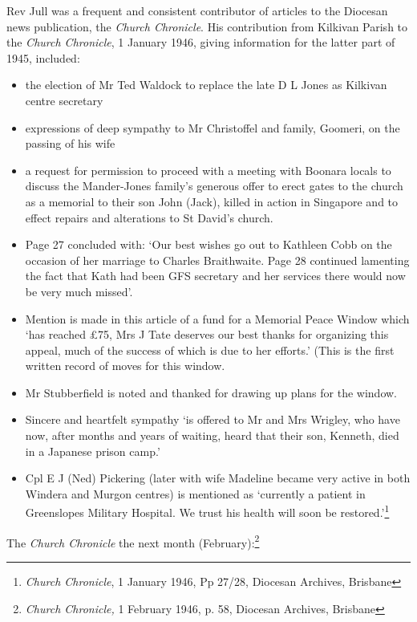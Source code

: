Rev Jull was a frequent and consistent contributor of articles to the Diocesan news publication, the \emph{Church Chronicle}. His contribution from Kilkivan Parish to the \emph{Church Chronicle}, 1 January 1946, giving information for the latter part of 1945, included:

\begin{itemize}
\item
  the election of Mr Ted Waldock to replace the late D L Jones as Kilkivan centre secretary
\item
  expressions of deep sympathy to Mr Christoffel and family, Goomeri, on the passing of his wife
\item
  a request for permission to proceed with a meeting with Boonara locals to discuss the Mander-Jones family's generous offer to erect gates to the church as a memorial to their son John (Jack), killed in action in Singapore and to effect repairs and alterations to St David's church.
\item
  Page 27 concluded with: `Our best wishes go out to Kathleen Cobb on the occasion of her marriage to Charles Braithwaite. Page 28 continued lamenting the fact that Kath had been GFS secretary and her services there would now be very much missed'.
\item
  Mention is made in this article of a fund for a Memorial Peace Window which `has reached £75, Mrs J Tate deserves our best thanks for organizing this appeal, much of the success of which is due to her efforts.' (This is the first written record of moves for this window.
\item
  Mr Stubberfield is noted and thanked for drawing up plans for the window.
\item
  Sincere and heartfelt sympathy `is offered to Mr and Mrs Wrigley, who have now, after months and years of waiting, heard that their son, Kenneth, died in a Japanese prison camp.'
\item
  Cpl E J (Ned) Pickering (later with wife Madeline became very active in both Windera and Murgon centres) is mentioned as `currently a patient in Greenslopes Military Hospital. We trust his health will soon be restored.'\footnote{\emph{Church Chronicle}, 1 January 1946, Pp 27/28, Diocesan Archives, Brisbane}
\end{itemize}

The \emph{Church Chronicle} the next month (February):\footnote{\emph{Church Chronicle,} 1 February 1946, p. 58, Diocesan Archives, Brisbane}

